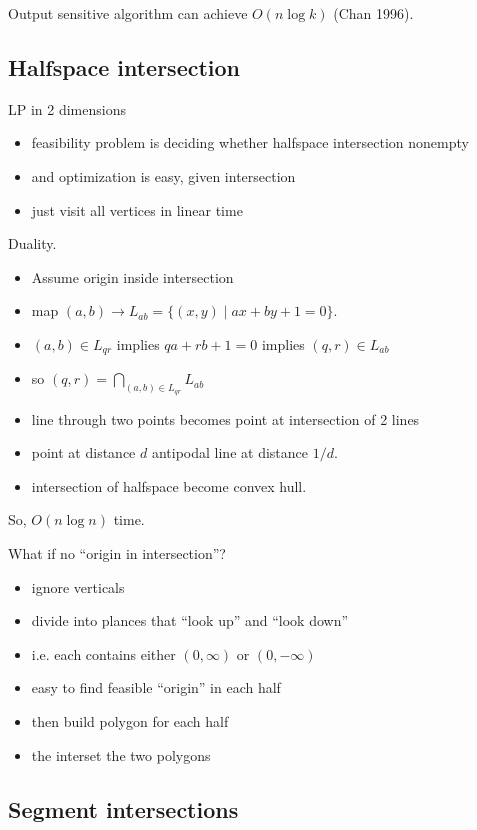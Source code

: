 \documentclass{article}
\begin{document}
Output sensitive algorithm can achieve $O(n\log k)$ (Chan 1996).

\subsection{Halfspace intersection}

LP in 2 dimensions
\begin{itemize}
\item feasibility problem is deciding whether halfspace intersection
  nonempty
\item and optimization is easy, given intersection
\item just visit all vertices in linear time
\end{itemize}

Duality. 
\begin{itemize}
\item Assume origin inside intersection
\item map $(a,b) \rightarrow L_{ab} = \{(x,y) \mid ax+by+1=0\}$.
\item $(a,b) \in L_{qr}$ implies $qa+rb+1=0$ implies $(q,r) \in
  L_{ab}$
\item so $(q,r) = \bigcap_{(a,b) \in L_{qr}} L_{ab}$ 
\item line through two points becomes point at intersection of 2 lines
\item point at distance $d$ antipodal line at distance $1/d$.
\item intersection of halfspace become convex hull.
\end{itemize}

So, $O(n\log n)$ time.

What if no ``origin in intersection''?
\begin{itemize}
\item ignore verticals
\item divide into plances that ``look up'' and ``look down''
\item i.e. each contains either $(0,\infty)$ or $(0,-\infty)$
\item easy to find feasible ``origin'' in each half
\item then build polygon for each half
\item the interset the two polygons
\end{itemize}

\subsection{Segment intersections}
\end{document}
